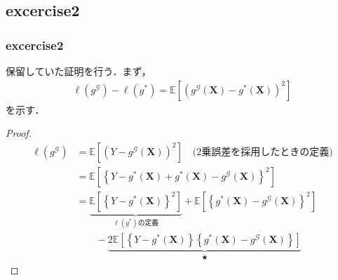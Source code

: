 \documentclass[dvipdfmx,cjk]{beamer}
\theoremstyle{example}
\begin{document}
\subsection{excercise2}
\begin{frame}
    \frametitle{excercise2}
    保留していた証明を行う．まず，
    \begin{align*}
        \ell(g^\mathcal{G})-\ell(g^*)=\mathbb{E}\left[(g^\mathcal{G}(\boldsymbol{X})-g^*(\boldsymbol{X}))^2\right]
    \end{align*}
    を示す．
    \begin{proof}
        \begin{align*}
            \ell(g^\mathcal{G}) & =\mathbb{E}\left[(Y-g^\mathcal{G}(\boldsymbol{X}))^2\right] \quad \text{(2乗誤差を採用したときの定義)}                                                                                                   \\
                                & =\mathbb{E}\left[\left\{Y-g^*(\boldsymbol{X})+g^*(\boldsymbol{X})-g^\mathcal{G}(\boldsymbol{X})\right\}^2\right]                                                                            \\
                                & =\underbrace{\mathbb{E}\left[\left\{Y-g^*(\boldsymbol{X})\right\}^2\right]}_\text{$\ell(g^*)$の定義}+\mathbb{E}\left[\left\{g^*(\boldsymbol{X})-g^\mathcal{G}(\boldsymbol{X})\right\}^2\right] \\
                                & \qquad-\underbrace{2\mathbb{E}\left[\left\{Y-g^*(\boldsymbol{X})\right\}\left\{g^*(\boldsymbol{X})-g^\mathcal{G}(\boldsymbol{X})\right\}\right]}_\text{$\bigstar$}
        \end{align*}
        \renewcommand{\qedsymbol}{}
    \end{proof}
\end{frame}
\end{document}
